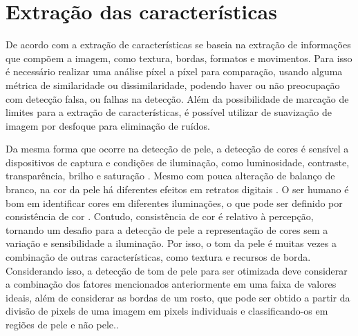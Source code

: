 \section{Extração das características}
De acordo com \cite{rehem2009tecnicas} a extração de características se baseia na extração de informações que compõem a imagem, como textura, bordas, formatos e movimentos. Para isso é necessário realizar uma análise píxel a píxel para comparação, usando alguma métrica de similaridade ou dissimilaridade, podendo haver ou não preocupação com detecção falsa, ou falhas na detecção. Além da possibilidade de marcação de limites para a extração de características, é possível utilizar de suavização de imagem por desfoque para eliminação de ruídos.

Da mesma forma que ocorre na detecção de pele, a detecção de cores é sensível a dispositivos de captura e condições de iluminação, como luminosidade, contraste, transparência, brilho e saturação \cite{Human_Skin_Detection_Using_RGB_HSV_and_YCbCr_Color_Models}. Mesmo com pouca alteração de balanço de branco, na cor da pele há diferentes efeitos em retratos digitais \cite{Skin_Color_Perception_in_Portrait_Image_and_AR_based_Humanoid_Emoji}. O ser humano é bom em identificar cores em diferentes iluminações, o que pode ser definido por consistência de cor \cite{Skin_detection_ashort_tutorial}. Contudo, consistência de cor é relativo à percepção, tornando um desafio para a detecção de pele a representação de cores sem a variação e sensibilidade a iluminação. Por isso, o tom da pele é muitas vezes a combinação de outras características, como textura e recursos de borda. Considerando isso, a detecção de tom de pele para ser otimizada deve considerar a combinação dos fatores mencionados anteriormente em uma faixa de valores ideais, além de considerar as bordas de um rosto, que pode ser obtido a partir da divisão de pixels de uma imagem em pixels individuais e classificando-os em regiões de pele e não pele.\cite{Human_Skin_Detection_Using_RGB_HSV_and_YCbCr_Color_Models}.

